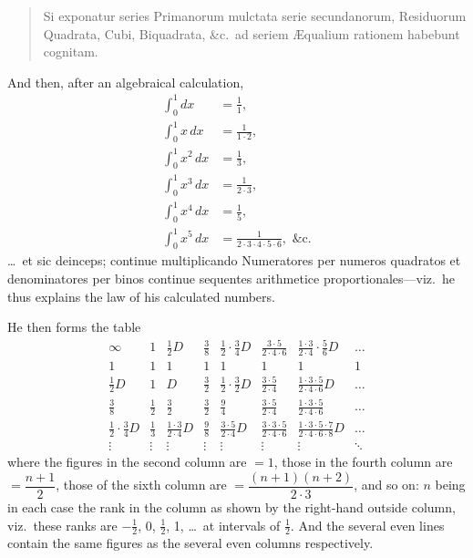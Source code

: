 \documentclass[11pt,a4paper]{article}
\begin{document}
\begin{quote}
Si exponatur series Primanorum mulctata serie secundanorum, Residuorum Quadrata, Cubi, Biquadrata, \&c.\ ad seriem \AE qualium rationem habebunt cognitam.
\end{quote}

And then, after an algebraical calculation,
\begin{align*}
\int_0^1 dx &= \frac{1}{1}, \\
\int_0^1 x\,dx &= \frac{1}{1 \cdot 2}, \\
\int_0^1 x^2\,dx &= \frac{1}{3}, \\
\int_0^1 x^3\,dx &= \frac{1}{2 \cdot 3}, \\
\int_0^1 x^4\,dx &= \frac{1}{5}, \\
\int_0^1 x^5\,dx &= \frac{1}{2 \cdot 3 \cdot 4 \cdot 5 \cdot 6}, \text{ \&c.}
\end{align*}
\ldots\ et sic deinceps; continue multiplicando Numeratores per numeros quadratos et denominatores per binos continue sequentes arithmetice proportionales---viz.\ he thus explains the law of his calculated numbers.

He then forms the table
\[
\begin{array}{cccccccc}
\infty & 1 & \tfrac{1}{2}D & \tfrac{3}{8} & \tfrac{1}{2} \cdot \tfrac{3}{4}D & \tfrac{3 \cdot 5}{2 \cdot 4 \cdot 6} & \tfrac{1 \cdot 3}{2 \cdot 4} \cdot \tfrac{5}{6}D & \ldots \\
1 & 1 & 1 & 1 & 1 & 1 & 1 & 1 \\
\tfrac{1}{2}D & 1 & D & \tfrac{3}{2} & \tfrac{1}{2} \cdot \tfrac{3}{2}D & \tfrac{3 \cdot 5}{2 \cdot 4} & \tfrac{1 \cdot 3 \cdot 5}{2 \cdot 4 \cdot 6}D & \ldots \\
\tfrac{3}{8} & \tfrac{1}{2} & \tfrac{3}{2} & \tfrac{3}{2} & \tfrac{9}{4} & \tfrac{3 \cdot 5}{2 \cdot 4} & \tfrac{1 \cdot 3 \cdot 5}{2 \cdot 4 \cdot 6} & \ldots \\
\tfrac{1}{2} \cdot \tfrac{3}{4}D & \tfrac{1}{3} & \tfrac{1 \cdot 3}{2 \cdot 4}D & \tfrac{9}{8} & \tfrac{3 \cdot 5}{2 \cdot 4}D & \tfrac{3 \cdot 3 \cdot 5}{2 \cdot 4 \cdot 6} & \tfrac{1 \cdot 3 \cdot 5 \cdot 7}{2 \cdot 4 \cdot 6 \cdot 8}D & \ldots \\
\vdots & \vdots & \vdots & \vdots & \vdots & \vdots & \vdots & \ddots
\end{array}
\]
where the figures in the second column are $=1$, those in the fourth column are $= \dfrac{n+1}{2}$, those of the sixth column are $= \dfrac{(n+1)(n+2)}{2 \cdot 3}$, and so on: $n$ being in each case the rank in the column as shown by the right-hand outside column, viz.\ these ranks are $-\tfrac{1}{2}$, 0, $\tfrac{1}{2}$, 1, \ldots\ at intervals of $\tfrac{1}{2}$. And the several even lines contain the same figures as the several even columns respectively.
\end{document}
